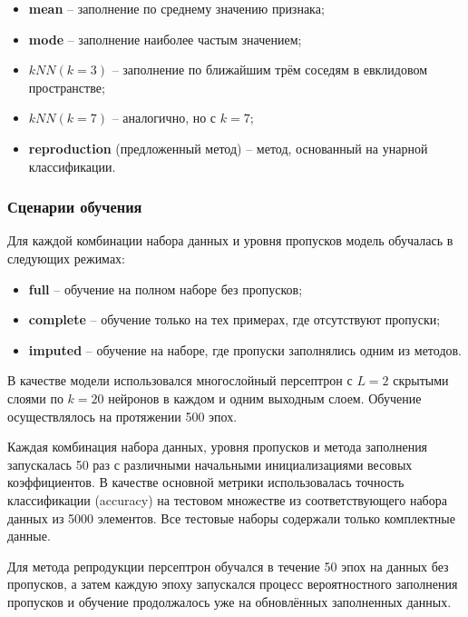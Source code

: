 \begin{itemize}
    \item \textbf{mean} -- заполнение по среднему значению признака;
    \item \textbf{mode} -- заполнение наиболее частым значением;
    \item \textbf{\(kNN (k=3)\)} -- заполнение по ближайшим трём соседям в евклидовом пространстве;
    \item \textbf{\(kNN (k=7)\)} -- аналогично, но с \(k=7\);
    \item \textbf{reproduction} (предложенный метод) -- метод, основанный на унарной классификации.
\end{itemize}

\subsubsection{Сценарии обучения}
Для каждой комбинации набора данных и уровня пропусков модель обучалась в следующих режимах:

\begin{itemize}
    \item \textbf{full} -- обучение на полном наборе без пропусков;
    \item \textbf{complete} -- обучение только на тех примерах, где отсутствуют пропуски;
    \item \textbf{imputed} -- обучение на наборе, где пропуски заполнялись одним из методов.
\end{itemize}

В качестве модели использовался многослойный персептрон с \(L=2\) скрытыми слоями по \(k=20\) нейронов в каждом и одним выходным слоем. Обучение осуществлялось на протяжении 500 эпох.

Каждая комбинация набора данных, уровня пропусков и метода заполнения запускалась 50 раз с различными начальными инициализациями весовых коэффициентов. В качестве основной метрики использовалась точность классификации (accuracy) на тестовом множестве из соответствующего набора данных из 5000 элементов. Все тестовые наборы содержали только комплектные данные.

Для метода репродукции персептрон обучался в течение 50 эпох на данных без пропусков, а затем каждую эпоху запускался процесс вероятностного заполнения пропусков и обучение продолжалось уже на обновлённых заполненных данных.

